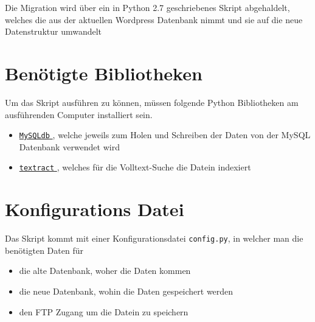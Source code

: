 Die Migration wird \"uber ein in Python 2.7 geschriebenes Skript abgehaldelt, welches die aus der aktuellen Wordpress Datenbank nimmt und sie auf die neue Datenstruktur umwandelt

\section{Ben\"otigte Bibliotheken}
Um das Skript ausf\"uhren zu k\"onnen, m\"ussen folgende Python Bibliotheken am ausf\"uhrenden Computer installiert sein.

\begin{itemize}
  \item \href{http://mysql-python.sourceforge.net/MySQLdb.html}{ \texttt{MySQLdb} }, welche jeweils zum Holen und Schreiben der Daten von der MySQL Datenbank verwendet wird
  \item \href{https://textract.readthedocs.io/en/latest/}{ \texttt{textract} }, welches f\"ur die Volltext-Suche die Datein indexiert
\end{itemize}

\section{Konfigurations Datei}
Das Skript kommt mit einer Konfigurationsdatei \texttt{config.py}, in welcher man die ben\"otigten Daten f\"ur

\begin{itemize}
  \item die alte Datenbank, woher die Daten kommen
  \item die neue Datenbank, wohin die Daten gespeichert werden
  \item den FTP Zugang um die Datein zu speichern\\
\end{itemize}

